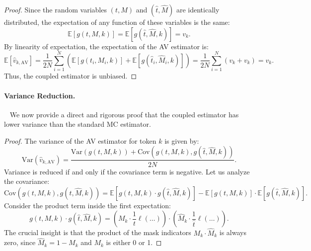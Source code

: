 {\begin{proof}
  Since the random variables $(t,M)$ and $(\hat{t},\hat{M})$ are identically distributed, the expectation of any function of these variables is the same:
  \begin{equation}
      \mathbb{E}[g(t, M, k)] = \mathbb{E}[g(\hat{t}, \hat{M}, k)] = v_k.
  \end{equation}
  By linearity of expectation, the expectation of the AV estimator is:
  \begin{equation}
      \mathbb{E}[\hat{v}_{k, \text{AV}}] = \frac{1}{2N} \sum_{i=1}^{N} (\mathbb{E}[g(t_i, M_i, k)] + \mathbb{E}[g(\hat{t}_i, \hat{M}_i, k)]) = \frac{1}{2N} \sum_{i=1}^{N} (v_k + v_k) = v_k.
  \end{equation}
  Thus, the coupled estimator is unbiased.
  \end{proof}
  
  \paragraph{Variance Reduction.}~
  We now provide a direct and rigorous proof that the coupled estimator has lower variance than the standard MC estimator.
  \begin{proof}
  The variance of the AV estimator for token $k$ is given by:
  \begin{equation}
      \text{Var}(\hat{v}_{k, \text{AV}}) = \frac{\text{Var}(g(t, M, k)) + \text{Cov}(g(t, M, k), g(\hat{t}, \hat{M}, k))}{2N}.
  \end{equation}
  Variance is reduced if and only if the covariance term is negative.
  Let us analyze the covariance:
  \begin{equation}
      \text{Cov}(g(t, M, k), g(\hat{t}, \hat{M}, k)) = \mathbb{E}[g(t, M, k) \cdot g(\hat{t}, \hat{M}, k)] - \mathbb{E}[g(t, M, k)] \cdot \mathbb{E}[g(\hat{t}, \hat{M}, k)].
  \end{equation}
  Consider the product term inside the first expectation:
  \begin{equation}
      g(t, M, k) \cdot g(\hat{t}, \hat{M}, k) = \left( M_k \cdot \frac{1}{t} \ell(\dots) \right) \cdot \left( \hat{M}_k \cdot \frac{1}{\hat{t}} \ell(\dots) \right).
  \end{equation}
  The crucial insight is that the product of the mask indicators $M_k \cdot \hat{M}_k$ is always zero, since $\hat{M}_k = 1 - M_k$ and $M_k$ is either 0 or 1.

\end{proof}}
